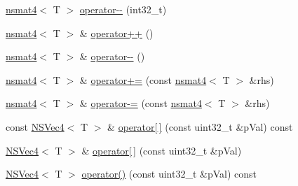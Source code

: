 \begin{DoxyCompactItemize}
\item 
\hyperlink{structnsmat4}{nsmat4}$<$ T $>$ \hyperlink{structnsmat4_a984c5ad111fbc8d859656113e25875a9}{operator-\/-\/} (int32\-\_\-t)
\item 
\hyperlink{structnsmat4}{nsmat4}$<$ T $>$ \& \hyperlink{structnsmat4_a05f04778a87353a0fb6fb92f2308e69c}{operator++} ()
\item 
\hyperlink{structnsmat4}{nsmat4}$<$ T $>$ \& \hyperlink{structnsmat4_a5f4409ca9df9bcc15be36fd0b681b464}{operator-\/-\/} ()
\item 
\hyperlink{structnsmat4}{nsmat4}$<$ T $>$ \& \hyperlink{structnsmat4_a5a5f9e5986096b9b18474bffa8338066}{operator+=} (const \hyperlink{structnsmat4}{nsmat4}$<$ T $>$ \&rhs)
\item 
\hyperlink{structnsmat4}{nsmat4}$<$ T $>$ \& \hyperlink{structnsmat4_a79ab690d8fcb8da7637d9e798e4ff762}{operator-\/=} (const \hyperlink{structnsmat4}{nsmat4}$<$ T $>$ \&rhs)
\item 
const \hyperlink{structNSVec4}{N\-S\-Vec4}$<$ T $>$ \& \hyperlink{structnsmat4_a4ffb31f855b10374cad6e465ea642b2b}{operator\mbox{[}$\,$\mbox{]}} (const uint32\-\_\-t \&p\-Val) const 
\item 
\hyperlink{structNSVec4}{N\-S\-Vec4}$<$ T $>$ \& \hyperlink{structnsmat4_a11fd1951758b9e2734747060aa08b323}{operator\mbox{[}$\,$\mbox{]}} (const uint32\-\_\-t \&p\-Val)
\item 
\hyperlink{structNSVec4}{N\-S\-Vec4}$<$ T $>$ \hyperlink{structnsmat4_ac54c9fd888409528c31c9493969cdf6c}{operator()} (const uint32\-\_\-t \&p\-Val) const 
\end{DoxyCompactItemize}


